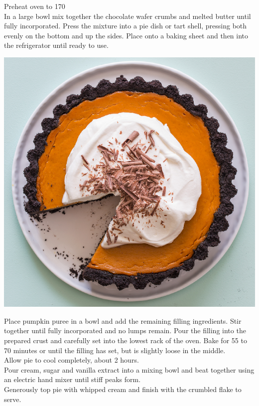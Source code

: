 \documentclass{tufte-book}
\begin{document}
Preheat oven to 170\celsius
\\ In a large bowl mix together the chocolate wafer crumbs and melted butter until fully incorporated. Press the mixture into a pie dish or tart shell, pressing both evenly on the bottom and up the sides. Place onto a baking sheet and then into the refrigerator until ready to use.
\begin{marginfigure}%
  \includegraphics[width=\linewidth]{pumpkinpiesquare.png}
\end{marginfigure}
 Place pumpkin puree in a bowl and add the remaining filling ingredients. Stir together until fully incorporated and no lumps remain. Pour the filling into the prepared crust and carefully set into the lowest rack of the oven. Bake for 55 to 70 minutes or until the filling has set, but is slightly loose in the middle.
\\Allow pie to cool completely, about 2 hours.
\\ Pour cream, sugar and vanilla extract into a mixing bowl and beat together using an electric hand mixer until stiff peaks form.
\\Generously top pie with whipped cream and finish with the crumbled flake to serve.

\end{document}

